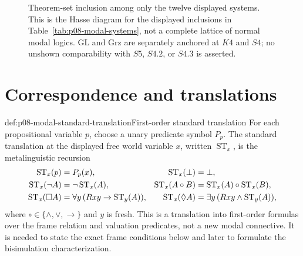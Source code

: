 
\begin{figure}[!htbp]
\centering
{}
\caption{Theorem-set inclusion among only the twelve displayed systems.  This
is the Hasse diagram for the displayed inclusions in
Table~\ref{tab:p08-modal-systems}, not a complete lattice of normal modal
logics.  GL and Grz are separately anchored at \(K4\) and \(S4\); no unshown
comparability with \(S5\), \(S4.2\), or \(S4.3\) is asserted.}
\label{fig:p08-modal-lattice}
\end{figure}

\section{Correspondence and translations}

\begin{hbdefinition}{def:p08-modal-standard-translation}{First-order standard translation}
For each propositional variable \(p\), choose a unary predicate symbol
\(P_p\).  The standard translation at the displayed free world variable
\(x\), written \(\operatorname{ST}_x\), is the metalinguistic recursion
\[
\begin{aligned}
 \operatorname{ST}_x(p)&=P_p(x),
 &\operatorname{ST}_x(\bot)&=\bot,\\
 \operatorname{ST}_x(\neg A)&=\neg\operatorname{ST}_x(A),
 &\operatorname{ST}_x(A\circ B)&=
   \operatorname{ST}_x(A)\circ\operatorname{ST}_x(B),\\
 \operatorname{ST}_x(\Box A)&=
   \forall y\,(Rxy\to\operatorname{ST}_y(A)),
 &\operatorname{ST}_x(\Diamond A)&=
   \exists y\,(Rxy\land\operatorname{ST}_y(A)),
\end{aligned}
\]
where \(\circ\in\{\land,\lor,\to\}\) and \(y\) is fresh.  This is a
translation into first-order formulas over the frame relation and valuation
predicates, not a new modal connective.  It is needed to state the exact frame
conditions below and later to formulate the bisimulation characterization.
\end{hbdefinition}

